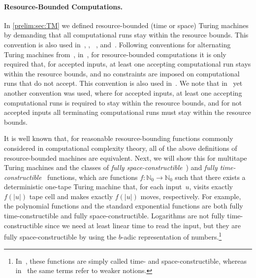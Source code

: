 \paragraph{Resource-Bounded Computations.} In \cref{prelim:sec:TM} we defined resource-bounded (time or space) Turing machines by demanding that all computational runs stay within the resource bounds.
This convention is also used in~\cite[p.~288]{HopUll79}, \cite[Sec.2]{Jones75}, ~\cite[Def.~7.9]{sipser2012theory}, and~\cite[Sec.~2.1.2]{DBLP:books/daglib/0023084}.
Following conventions for alternating Turing machines from~\cite{ChandraKozenStockmeyer1981_Alternation,LadnerLiptonStockmeyer1984_AltPushdownStack},
in~\cite[p.~5]{Wehar2016},
for resource-bounded computations it is only required that, for accepted inputs,
at least one accepting computational run stays within the resource bounds, and no constraints are imposed
on computational runs that do not accept.
This convention is also used in~\cite[Def.~2.11]{DBLP:series/txtcs/BalcazarDG95}.
We note that in~\cite{DBLP:journals/siamcomp/BermanH77}
yet another convention was used,
where for accepted inputs, at least one accepting computational runs 
is required to stay within the resource bounds,
and for not accepted inputs all terminating computational runs
must stay within the resource bounds.

It is well known that, for reasonable resource-bounding functions commonly considered in
computational complexity theory, all of the above definitions of
resource-bounded machines are equivalent. 
Next, we will show this for multitape Turing machines and the classes
of \emph{fully space-constructible}~\cite[p.~297]{HopUll79}) and \emph{fully time-constructible}~\cite[p.~299]{HopUll79}
functions, which are functions $f \colon \mathbb N_0 \to \mathbb N_0$
such that there exists a deterministic one-tape Turing machine that, for each input~$u$, visits 
exactly $f(|u|)$ tape cell and makes exactly $f(|u|)$ moves, respectively.
For example, the polynomial functions and the standard exponential
functions are both fully time-constructible and fully space-constructible.
Logarithms are not fully time-constructible since
we need at least linear time to read the input,
but they are fully space-constructible by using 
the $b$-adic representation of numbers.\footnote{In~\cite[Def.~2.18]{DBLP:series/txtcs/BalcazarDG95},
	these functions are simply called time- and space-constructible,
	whereas in~\cite{HopUll79} the same terms refer to weaker notions.}

